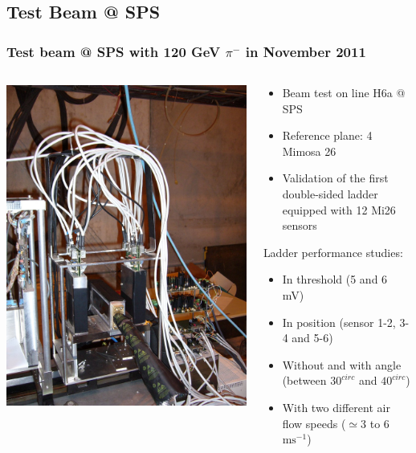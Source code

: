 \documentclass{beamer}
\begin{document}
  \subsection{Test Beam @ SPS}
  \begin{frame}
    \frametitle{Test beam @ SPS with 120 GeV $\pi^-$ in November 2011}

    \begin{columns}[t]
      \begin{column}{4cm}
        \begin{center}
          \includegraphics[width = 4 cm]{Pictures/plume_testBeam_nov2011.jpg}
        \end{center}
      \end{column}

      \begin{column}{7cm}
        \vspace{-0.8cm}
        \begin{itemize}
          \item Beam test on line H6a @ SPS
          \item Reference plane: 4 Mimosa 26
          \item Validation of the first double-sided ladder equipped with 12 Mi26 sensors
        \end{itemize}

        \vspace{-0.3cm}
        \begin{block}{Ladder performance studies:}
          \begin{itemize}
            \item In threshold (5 and 6 mV)
            \item In position (sensor 1-2, 3-4 and 5-6)
            \item Without and with angle (between $30^{circ}$ and $40^{circ}$)
            \item With two different air flow speeds ($\simeq 3$ to 6 $\text{ms}^{-1}$)
          \end{itemize}
        \end{block}
      \end{column}
    \end{columns}

    \vspace{0.1cm}
    \footnotesize{
    }
  \end{frame}
\end{document}
